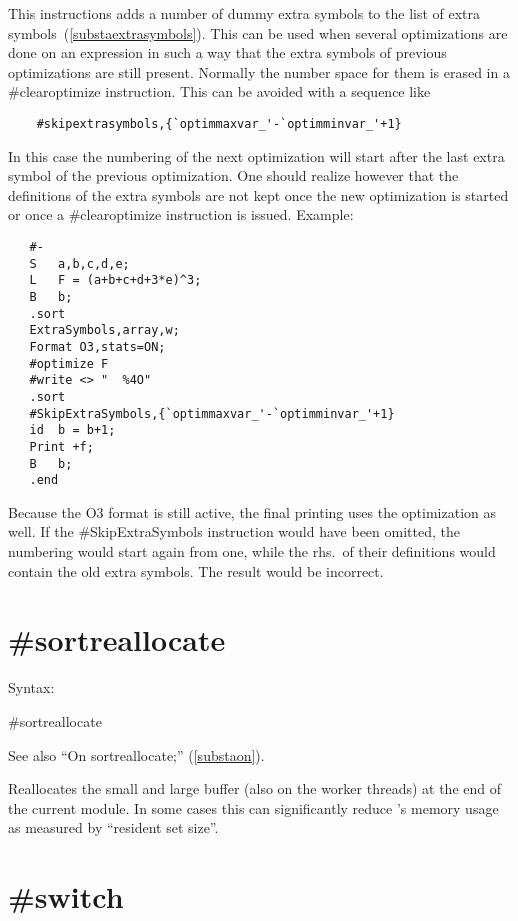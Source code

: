 \noindent This instructions adds a number of dummy extra 
symbols to the list of extra 
symbols~(\ref{substaextrasymbols}). This can be used when several 
optimizations are done on an expression in such a way that the extra 
symbols of previous optimizations are still present. Normally the number 
space for them is erased in a \#clearoptimize instruction. This can be 
avoided with a sequence like
\begin{verbatim}
	#skipextrasymbols,{`optimmaxvar_'-`optimminvar_'+1}
\end{verbatim}
In this case the numbering of the next optimization will start after the 
last extra symbol of the previous optimization.
One should realize however that the definitions of the extra symbols are 
not kept once the new optimization is started or once a \#clearoptimize 
instruction is issued. Example:
\begin{verbatim}
   #-
   S   a,b,c,d,e;
   L   F = (a+b+c+d+3*e)^3;
   B   b;
   .sort
   ExtraSymbols,array,w;
   Format O3,stats=ON;
   #optimize F
   #write <> "  %4O"
   .sort
   #SkipExtraSymbols,{`optimmaxvar_'-`optimminvar_'+1}
   id  b = b+1;
   Print +f;
   B   b;
   .end
\end{verbatim}
Because the O3 format is still active, the final printing uses the 
optimization as well. If the \#SkipExtraSymbols instruction would have been 
omitted, the numbering would start again from one, while the rhs.\ of their 
definitions would contain the old extra symbols. The result would be 
incorrect.

\section{\#sortreallocate}
\label{presortreallocate}

\noindent Syntax:

\#sortreallocate

\noindent See also ``On sortreallocate;'' (\ref{substaon}).

\noindent Reallocates the small and large buffer (also on the worker threads)
at the end of the current module. In some cases this can significantly reduce
\FORM's memory usage as measured by ``resident set size''.

\section{\#switch}
\label{preswitch}

